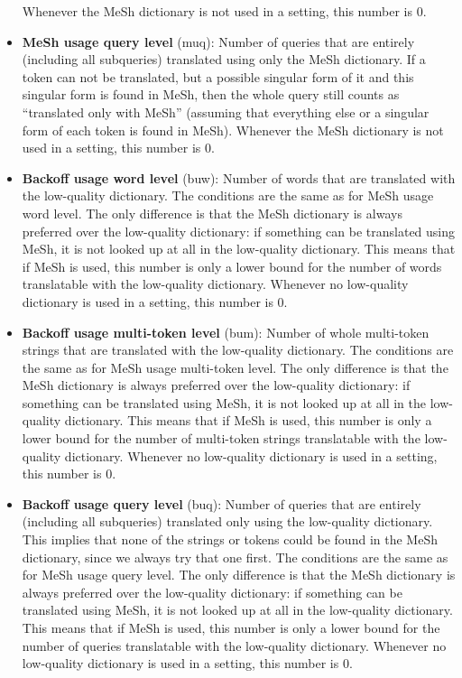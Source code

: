 \documentclass[a4paper,11pt]{article}
\begin{document}
\begin{itemize}
		Whenever the MeSh dictionary is not used in a setting, this number is 0. 
		\item \textbf{MeSh usage query level} (muq): Number of queries that are entirely (including all subqueries) translated using only the MeSh dictionary. If a token can not be translated, but a possible singular form of it and this singular form is found in MeSh, then the whole query still counts as ``translated only with MeSh'' (assuming that everything else or a singular form of each token is found in MeSh). Whenever the MeSh dictionary is not used in a setting, this number is 0. 
		\item \textbf{Backoff usage word level} (buw): Number of words that are translated with the low-quality dictionary. The conditions are the same as for MeSh usage word level. The only difference is that the MeSh dictionary is always preferred over the low-quality dictionary: if something can be translated using MeSh, it is not looked up at all in the low-quality dictionary. This means that if MeSh is used, this number is only a lower bound for the number of words translatable with the low-quality dictionary. Whenever no low-quality dictionary is used in a setting, this number is 0.
		\item \textbf{Backoff usage multi-token level} (bum): Number of whole multi-token strings that are translated with the low-quality dictionary. The conditions are the same as for MeSh usage multi-token level. The only difference is that the MeSh dictionary is always preferred over the low-quality dictionary: if something can be translated using MeSh, it is not looked up at all in the low-quality dictionary. This means that if MeSh is used, this number is only a lower bound for the number of multi-token strings translatable with the low-quality dictionary. Whenever no low-quality dictionary is used in a setting, this number is 0.
		\item \textbf{Backoff usage query level} (buq): Number of queries that are entirely (including all subqueries) translated only using the low-quality dictionary. This implies that none of the strings or tokens could be found in the MeSh dictionary, since we always try that one first. The conditions are the same as for MeSh usage query level. The only difference is that the MeSh dictionary is always preferred over the low-quality dictionary: if something can be translated using MeSh, it is not looked up at all in the low-quality dictionary. This means that if MeSh is used, this number is only a lower bound for the number of queries translatable with the low-quality dictionary. Whenever no low-quality dictionary is used in a setting, this number is 0.

\end{itemize}
\end{document}

